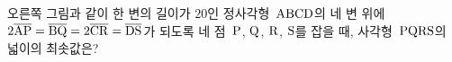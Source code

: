\noindent\begin{minipage}[t]{0.58\linewidth}\vspace{0pt}\raggedright 오른쪽 그림과 같이 한 변의 길이가 $20$인 정사각형~$\mathrm{ABCD}$의 네 변 위에 $2\overline{\mathrm{AP}}=\overline{\mathrm{BQ}}=2\overline{\mathrm{CR}}=\overline{\mathrm{DS}}$가 되도록 네 점~$\mathrm{P}$, $\mathrm{Q}$, $\mathrm{R}$, $\mathrm{S}$를 잡을 때, 사각형~$\mathrm{PQRS}$의 넓이의 최솟값은?\end{minipage}\hfill\begin{minipage}[t]{0.4\linewidth}\vspace{0pt}\centering \resizebox{\ifdim\width>\linewidth\linewidth\else\width\fi}{!}{}\end{minipage}\par
{}
